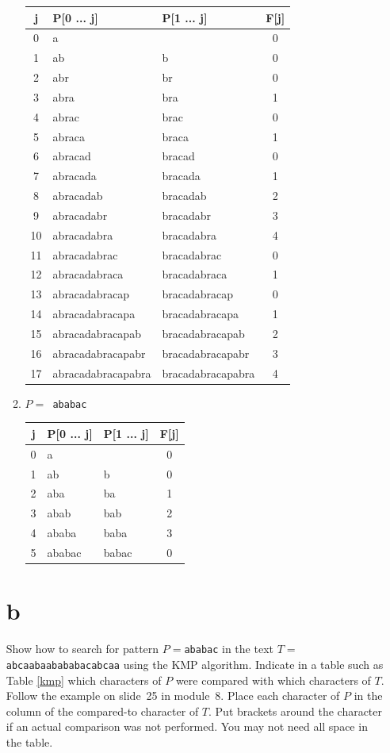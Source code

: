 \documentclass[12pt]{article}
\begin{document}
\begin{itemize}
\begin{enumerate}
\begin{center}
  \begin{tabular}{c|l|l|c}
    \hline
    \textbf{j} & \textbf{P[0 ... j]} & \textbf{P[1 ... j]} & \textbf{F[j]}\\
    \hline
    0 & a &  & 0\\
    1 & ab & b & 0\\
    2 & abr & br & 0\\
    3 & abra & bra & 1\\
    4 & abrac & brac & 0\\
    5 & abraca & braca & 1\\
    6 & abracad & bracad & 0\\
    7 & abracada & bracada & 1\\
    8 & abracadab & bracadab & 2\\
    9 & abracadabr & bracadabr & 3\\
    10 & abracadabra & bracadabra & 4\\
    11 & abracadabrac & bracadabrac & 0\\
    12 & abracadabraca & bracadabraca & 1\\
    13 & abracadabracap & bracadabracap & 0\\
    14 & abracadabracapa & bracadabracapa & 1\\
    15 & abracadabracapab & bracadabracapab & 2\\
    16 & abracadabracapabr & bracadabracapabr & 3\\
    17 & abracadabracapabra & bracadabracapabra & 4
  \end{tabular}
\end{center}
\item $P = ${\tt~ababac}
\begin{center}
  \begin{tabular}{c|l|l|c}
    \hline
    \textbf{j} & \textbf{P[0 ... j]} & \textbf{P[1 ... j]} & \textbf{F[j]}\\
    \hline
    0 & a &  & 0\\
    1 & ab & b & 0\\
    2 & aba & ba & 1\\
    3 & abab & bab & 2\\
    4 & ababa & baba & 3\\
    5 & ababac & babac & 0
  \end{tabular}
\end{center}
\end{enumerate}
\part{b}
Show how to search for pattern $P=$\texttt{ababac} in the text $T=$\texttt{abcaabaabababacabcaa} using the KMP algorithm. Indicate in a table such as Table \ref{kmp} which characters of $P$ were compared with which characters of $T$. Follow the example on slide~25 in module~8. Place each character of $P$ in the column of the compared-to character of $T$.  Put brackets around the character if an actual comparison was not performed. You may not need all space in the table.
\end{itemize}
\end{document}
